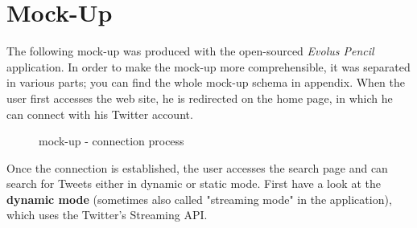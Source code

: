 \documentclass[a4paper,11pt]{report}
\begin{document}
\section{Mock-Up}
The following mock-up was produced with the open-sourced \emph{Evolus Pencil} application. In order to make the mock-up more comprehensible, it was separated in various parts; you can find the whole mock-up schema in appendix.
When the user first accesses the web site, he is redirected on the home page, in which he can connect with his Twitter account.
\begin{figure}[H]
\begin{center}
\caption{mock-up - connection process}
\end{center}
\end{figure}
\newpage
\vspace*{\fill}
Once the connection is established, the user accesses the search page and can search for Tweets either in dynamic or static mode. First have a look at the \textbf{dynamic mode} (sometimes also called "streaming mode" in the application), which uses the Twitter's Streaming API.
\bigskip
\end{document}
